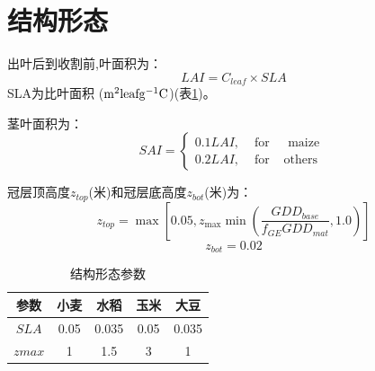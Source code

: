 \section{结构形态}
出叶后到收割前,叶面积为：
\begin{equation}
LAI=C_{leaf} \times SLA
\end{equation}
SLA为比叶面积 ($\rm m^2 leaf g^{-1} C$)(表\ref{tab:结构形态参数})。

茎叶面积为：
\begin{equation}
SAI=\left\{\begin{array}{lcc}0.1 LAI, & \text { for } & \text { maize } \\
   0.2 LAI, & \text { for } & \text {others}\end{array}\right.
\end{equation}

冠层顶高度$z_{top}$(米)和冠层底高度$z_{bot}$(米)为：
\begin{equation}
z_{top}=\max \left[0.05, z_{\max} \min \left(\frac{GDD_{base}}{f_{GE} G D D_{mat}}, 1.0\right)\right]
\end{equation}
\begin{equation}
z_{b o t}=0.02
\end{equation}

\begin{table}[]
  \centering
  \caption{结构形态参数}
  \label{tab:结构形态参数}
  \begin{tabular}{@{}ccccc@{}}
  \toprule
  参数   & 小麦   & 水稻    & 玉米   & 大豆    \\ \midrule
  $SLA$  & 0.05 & 0.035 & 0.05 & 0.035 \\
  $zmax$ & 1    & 1.5   & 3    & 1     \\ \bottomrule
  \end{tabular}
\end{table}
